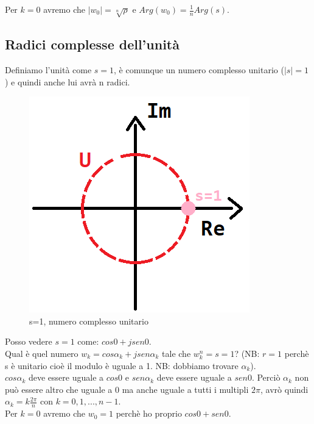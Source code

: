 Per $ k = 0$ avremo che $ |w_{0}| = \sqrt[n]{ \rho}  $ e $ Arg(w_{0}) = \frac{1}{n} Arg(s)$.\\

\subsection*{Radici complesse dell'unità}

Definiamo l'unità come $s=1$, è comunque un numero complesso unitario ($ |s| = 1$) e quindi anche lui avrà n radici.\\

\begin{figure}[h]
	\centering
	\includegraphics[scale=0.5]{immagini/pianoComplessoUnitari-s}
	\caption{ s=1, numero complesso unitario }
	\label{fig: numero complesso unitario}
\end{figure}


Posso vedere $s=1$ come: $ cos0 + j sen0 $. \\
Qual è quel numero $ w_{k} =  cos\alpha_{k} + j sen \alpha_{k} $ tale che $ w_{k}^{n} = s = 1$? (NB: $ r =1 $ perchè s è unitario cioè il modulo è uguale a 1. NB: dobbiamo trovare $ \alpha_{k}$).\\
$ cos \alpha_{k} $ deve essere uguale a $ cos0 $ e $ sen \alpha_{k} $ deve essere uguale a $ sen0 $. Perciò $\alpha_{k}$ non può essere altro che uguale a $ 0 $ ma anche uguale a tutti i multipli $ 2 \pi$, avrò quindi $ \alpha_{k} = k \frac{ 2 \pi}{n}$ con $ k = 0,1,...,n-1 $.\\

Per $ k = 0$ avremo che $ w_{0} = 1 $ perchè ho proprio $ cos0 + sen0$. \\

